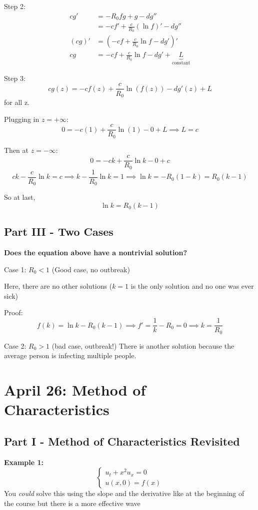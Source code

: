 \documentclass[12pt]{article}
\begin{document}
Step 2: 
\begin{align*}
    cg' &= -R_0 fg + g - dg''\\
    &= -cf' + \frac{c}{R_0}(\ln f)' - dg''\\
    (cg)' &= (-cf + \frac{c}{R_0}\ln f - dg')'\\
    cg &= -cf + \frac{c}{R_0}\ln f - dg' + \underbrace{L}_{\text{constant}}
\end{align*}

Step 3:
\[cg(z) = -cf(z) + \frac{c}{R_0}\ln(f(z)) - dg'(z) + L\]
for all z. 

Plugging in $z = +\infty$:
\[0 = -c(1) + \frac{c}{R_0}\ln (1) - 0 + L \implies L=c\]

Then at $z = -\infty$:
\[0 = -ck + \frac{c}{R_0}\ln k - 0 + c\]
\[ck - \frac{c}{R_0}\ln k = c \implies k - \frac{1}{R_0}\ln k = 1 \implies \ln k = -R_0(1 - k) = R_0(k - 1)\]

So at last, 
\[\boxed{\ln k = R_0(k - 1)}\]

\subsection*{Part III - Two Cases}
\textbf{Does the equation above have a nontrivial solution?}

Case 1: $R_0 < 1$ (Good case, no outbreak)

Here, there are no other solutions ($k=1$ is the only solution and no one was ever sick)

Proof: 
\[f(k) = \ln k - R_0(k - 1)\implies f' = \frac{1}{k} - R_0 = 0 \implies k = \frac{1}{R_0}\] 


Case 2: $R_0 > 1$ (bad case, outbreak!)
There is another solution because the average person is infecting multiple people.

\section{April 26: Method of Characteristics}
\subsection*{Part I - Method of Characteristics Revisited}
\textbf{Example 1:}
\[\begin{cases}
    u_t + x^2 u_x = 0\\
    u(x, 0) = f(x)
\end{cases}\]
You \emph{could} solve this using the slope and the derivative like at the beginning of the course but there is a more effective wave 
\end{document}
